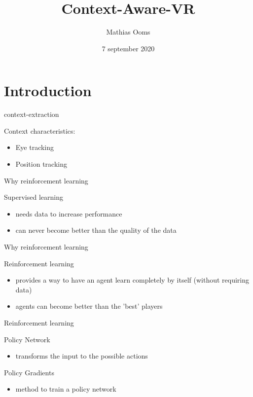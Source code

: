 \documentclass{beamer}
\title[Your Short Title]{Context-Aware-VR}
\author{Mathias Ooms}
\institute{University of Antwerp}
\date{7 september 2020}
\begin{document}
\begin{frame}
  \titlepage
\end{frame}


\section{Introduction}

\begin{frame}{context-extraction}


Context characteristics: 

\begin{itemize}
	\item Eye tracking
	\item Position tracking
\end{itemize}

\end{frame}


\begin{frame}{Why reinforcement learning}


Supervised learning 

\begin{itemize}
	\item needs data to increase performance
	\item can never become better than the quality of the data
\end{itemize}

\end{frame}


\begin{frame}{Why reinforcement learning}

Reinforcement learning 

\begin{itemize}
	\item provides a way to have an agent learn completely by itself (without requiring data) 
	\item agents can become better than the 'best' players
\end{itemize}

\end{frame}


\begin{frame}{Reinforcement learning}

Policy Network
\begin{itemize}
	\item transforms the input to the possible actions 
\end{itemize}

Policy Gradients
\begin{itemize}
	\item method to train a policy network
\end{itemize}

\end{frame}
\end{document}

